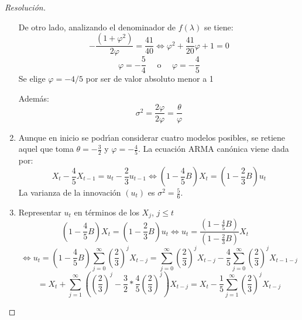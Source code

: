 \begin{ejemplo}
\begin{proof}[Resoluci\'{o}n]
\begin{enumerate}
De otro lado, analizando el denominador de $f(\lambda )$ se tiene:
\[
-\frac{\left( {1+\varphi^{2}} \right)}{2\varphi 
}=\frac{41}{40}\Longleftrightarrow \varphi^{2}+\frac{41}{20}\varphi +1=0
\]
\[
\varphi =-\frac{5}{4}\quad\text{ o }\quad\varphi =-\frac{4}{5}
\]
Se elige $\varphi = - 4/5$ por ser de valor absoluto menor a 1

Adem\'{a}s:
\[
\sigma^{2}=\frac{2\varphi }{2\varphi }=\frac{\theta }{\varphi }
\]

\item Aunque en inicio se podr\'{\i}an considerar cuatro modelos posibles, se retiene aquel que toma $\theta =-\frac{3}{2}$ y $\varphi =-\frac{4}{5}$. La ecuaci\'{o}n ARMA can\'{o}nica viene dada por:
\[
X_{t} -\frac{4}{5}X_{t-1} =u_{t} -\frac{2}{3}u_{t-1} \Longleftrightarrow \left( 
{1-\frac{4}{5}B} \right)X_{t} =\left( {1-\frac{2}{3}B} \right)u_{t} 
\]
La varianza de la innovaci\'{o}n $(u_{{t}})$ es $\sigma^{2}=\frac{5}{6}$.

\item Representar $u_{{t}}$ en t\'{e}rminos de los $X_{j}$, $j\le  t$
\[
\left( {1-\frac{4}{5}B} \right)X_{t} =\left( {1-\frac{2}{3}B} \right)u_{t} 
\Longleftrightarrow u_{t} =\frac{\left( {1-\frac{4}{5}B} \right)}{\left( 
{1-\frac{2}{3}B} \right)}X_{t} 
\quad
\]
\[
\Longleftrightarrow u_{t} =\left( {1-\frac{4}{5}B} 
\right)\sum_{j=0}^\infty {\left( {\frac{2}{3}} \right)}^{j}X_{t-j} 
=\sum_{j=0}^\infty {\left( {\frac{2}{3}} \right)}^{j}X_{t-j} 
-\frac{4}{5}\sum_{j=0}^\infty {\left( {\frac{2}{3}} \right)} 
^{j}X_{t-1-j} 
\]
\[
=X_{t} +\sum_{j=1}^\infty {\left( {\left( {\frac{2}{3}} 
\right)^{j}-\frac{3}{2}\ast \frac{4}{5}\left( {\frac{2}{3}} \right)^{j}} 
\right)X_{t-j} } 
=X_{t} -\frac{1}{5}\sum_{j=1}^\infty {\left( {\frac{2}{3}} \right)} 
^{j}X_{t-j} 
\]
\end{enumerate}
\end{proof}
\end{ejemplo}


